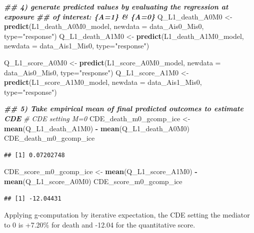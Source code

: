 \documentclass[
]{book}
\newenvironment{Shaded}{\begin{snugshade}}{\end{snugshade}}
\newcommand{\AttributeTok}[1]{\textcolor[rgb]{0.13,0.29,0.53}{#1}}
\newcommand{\CommentTok}[1]{\textcolor[rgb]{0.56,0.35,0.01}{\textit{#1}}}
\newcommand{\DocumentationTok}[1]{\textcolor[rgb]{0.56,0.35,0.01}{\textbf{\textit{#1}}}}
\newcommand{\FunctionTok}[1]{\textcolor[rgb]{0.13,0.29,0.53}{\textbf{#1}}}
\newcommand{\NormalTok}[1]{#1}
\newcommand{\OtherTok}[1]{\textcolor[rgb]{0.56,0.35,0.01}{#1}}
\newcommand{\SpecialCharTok}[1]{\textcolor[rgb]{0.81,0.36,0.00}{\textbf{#1}}}
\newcommand{\StringTok}[1]{\textcolor[rgb]{0.31,0.60,0.02}{#1}}
\begin{document}
\begin{Shaded}
\begin{Highlighting}[]
\DocumentationTok{\#\# 4) generate predicted values by evaluating the regression at exposure }
\DocumentationTok{\#\#    of interest: \{A=1\} \& \{A=0\}}
\NormalTok{Q\_L1\_death\_A0M0 }\OtherTok{\textless{}{-}} \FunctionTok{predict}\NormalTok{(L1\_death\_A0M0\_model, }
                           \AttributeTok{newdata =}\NormalTok{ data\_Ais0\_Mis0, }\AttributeTok{type=}\StringTok{"response"}\NormalTok{)}
\NormalTok{Q\_L1\_death\_A1M0 }\OtherTok{\textless{}{-}} \FunctionTok{predict}\NormalTok{(L1\_death\_A1M0\_model, }
                           \AttributeTok{newdata =}\NormalTok{ data\_Ais1\_Mis0, }\AttributeTok{type=}\StringTok{"response"}\NormalTok{)}

\NormalTok{Q\_L1\_score\_A0M0 }\OtherTok{\textless{}{-}} \FunctionTok{predict}\NormalTok{(L1\_score\_A0M0\_model, }
                           \AttributeTok{newdata =}\NormalTok{ data\_Ais0\_Mis0, }\AttributeTok{type=}\StringTok{"response"}\NormalTok{)}
\NormalTok{Q\_L1\_score\_A1M0 }\OtherTok{\textless{}{-}} \FunctionTok{predict}\NormalTok{(L1\_score\_A1M0\_model, }
                           \AttributeTok{newdata =}\NormalTok{ data\_Ais1\_Mis0, }\AttributeTok{type=}\StringTok{"response"}\NormalTok{)}

\DocumentationTok{\#\# 5) Take empirical mean of final predicted outcomes to estimate CDE}
\CommentTok{\# CDE setting M=0}
\NormalTok{CDE\_death\_m0\_gcomp\_ice }\OtherTok{\textless{}{-}} \FunctionTok{mean}\NormalTok{(Q\_L1\_death\_A1M0) }\SpecialCharTok{{-}} \FunctionTok{mean}\NormalTok{(Q\_L1\_death\_A0M0)}
\NormalTok{CDE\_death\_m0\_gcomp\_ice}
\end{Highlighting}
\end{Shaded}

\begin{verbatim}
## [1] 0.07202748
\end{verbatim}

\begin{Shaded}
\begin{Highlighting}[]
\NormalTok{CDE\_score\_m0\_gcomp\_ice }\OtherTok{\textless{}{-}} \FunctionTok{mean}\NormalTok{(Q\_L1\_score\_A1M0) }\SpecialCharTok{{-}} \FunctionTok{mean}\NormalTok{(Q\_L1\_score\_A0M0)}
\NormalTok{CDE\_score\_m0\_gcomp\_ice}
\end{Highlighting}
\end{Shaded}

\begin{verbatim}
## [1] -12.04431
\end{verbatim}

Applying g-computation by iterative expectation, the CDE setting the mediator to 0 is +7.20\% for death and -12.04 for the quantitative score.
\end{document}

